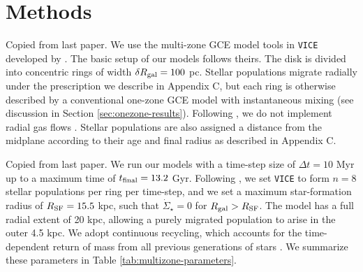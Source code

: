 \documentclass[twocolumn,twocolappendix,linenumbers]{aastex631}
\newcommand{\vice}{{\tt VICE}\xspace}
\newcommand{\todo}[1]{{\color{red}#1}}
\begin{document}
\citet{spitoni_remind_2024}

\section{Methods}
\label{sec:methods}

\todo{Copied from last paper.} We use the multi-zone GCE model tools in \vice developed by \citet{johnson_stellar_2021}. The basic setup of our models follows theirs. The disk is divided into concentric rings of width $\delta R_{\rm gal}=100$ pc. Stellar populations migrate radially under the prescription we describe in Appendix C, but each ring is otherwise described by a conventional one-zone GCE model with instantaneous mixing (see discussion in Section \ref{sec:onezone-results}). Following \citet{johnson_stellar_2021}, we do not implement radial gas flows \citep[e.g.,][]{LaceyFall1985-RadialGasFlows,BilitewskiSchonrich2012-RadialFlows}. Stellar populations are also assigned a distance from the midplane according to their age and final radius as described in Appendix C.

\todo{Copied from last paper.} We run our models with a time-step size of $\Delta t=10$ Myr up to a maximum time of $t_{\rm final}=13.2$ Gyr. Following \citet{johnson_stellar_2021}, we set \vice to form $n=8$ stellar populations per ring per time-step, and we set a maximum star-formation radius of $R_{\rm SF} = 15.5$ kpc, such that $\dot\Sigma_\star=0$ for $R_{\rm gal}>R_{\rm SF}$. The model has a full radial extent of 20 kpc, allowing a purely migrated population to arise in the outer 4.5 kpc. We adopt continuous recycling, which accounts for the time-dependent return of mass from all previous generations of stars \citep[see Equation 2 from][]{JohnsonWeinberg2020-Starbursts}. We summarize these parameters in Table \ref{tab:multizone-parameters}.
\end{document}
